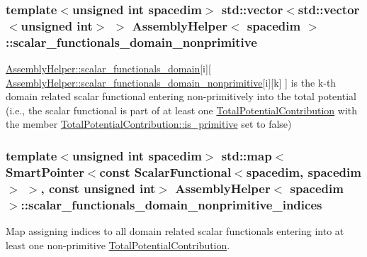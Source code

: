 \subsubsection[{\texorpdfstring{scalar\+\_\+functionals\+\_\+domain\+\_\+nonprimitive}{scalar_functionals_domain_nonprimitive}}]{\setlength{\rightskip}{0pt plus 5cm}template$<$unsigned int spacedim$>$ std\+::vector$<$std\+::vector$<$unsigned int$>$ $>$ {\bf Assembly\+Helper}$<$ spacedim $>$\+::scalar\+\_\+functionals\+\_\+domain\+\_\+nonprimitive\hspace{0.3cm}{\ttfamily [private]}}\hypertarget{class_assembly_helper_a5fe78a019aec03cbeeb336d1d2874729}{}\label{class_assembly_helper_a5fe78a019aec03cbeeb336d1d2874729}
\hyperlink{class_assembly_helper_aa6fa619e4c2582e95950e878cd06628e}{Assembly\+Helper\+::scalar\+\_\+functionals\+\_\+domain}\mbox{[}{\ttfamily i}\mbox{]}\mbox{[} \hyperlink{class_assembly_helper_a5fe78a019aec03cbeeb336d1d2874729}{Assembly\+Helper\+::scalar\+\_\+functionals\+\_\+domain\+\_\+nonprimitive}\mbox{[}{\ttfamily i}\mbox{]}\mbox{[}{\ttfamily k}\mbox{]} \mbox{]} is the {\ttfamily k-\/th} domain related scalar functional entering non-\/primitively into the total potential (i.\+e., the scalar functional is part of at least one \hyperlink{class_total_potential_contribution}{Total\+Potential\+Contribution} with the member \hyperlink{class_total_potential_contribution_a45bfb25a7693c949c26e223cf4a1a1e7}{Total\+Potential\+Contribution\+::is\+\_\+primitive} set to {\ttfamily false}) 
\subsubsection[{\texorpdfstring{scalar\+\_\+functionals\+\_\+domain\+\_\+nonprimitive\+\_\+indices}{scalar_functionals_domain_nonprimitive_indices}}]{\setlength{\rightskip}{0pt plus 5cm}template$<$unsigned int spacedim$>$ std\+::map$<${\bf Smart\+Pointer}$<$const {\bf Scalar\+Functional}$<$spacedim, spacedim$>$ $>$, const unsigned int$>$ {\bf Assembly\+Helper}$<$ spacedim $>$\+::scalar\+\_\+functionals\+\_\+domain\+\_\+nonprimitive\+\_\+indices\hspace{0.3cm}{\ttfamily [private]}}\hypertarget{class_assembly_helper_acf05fab2ddf57769a103d82a4f2d1cd3}{}\label{class_assembly_helper_acf05fab2ddf57769a103d82a4f2d1cd3}
Map assigning indices to all domain related scalar functionals entering into at least one non-\/primitive \hyperlink{class_total_potential_contribution}{Total\+Potential\+Contribution}. 

